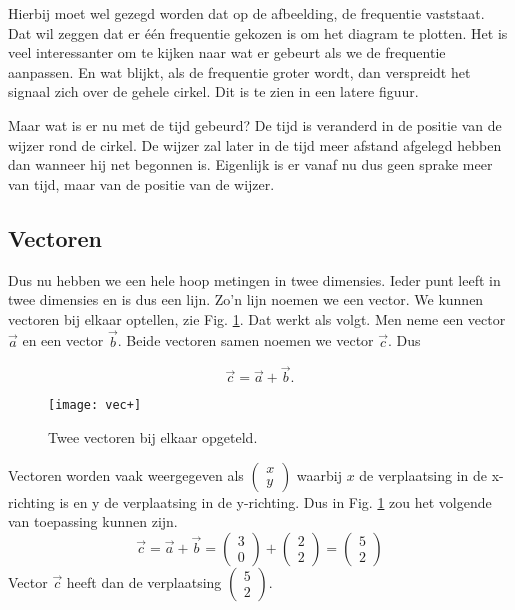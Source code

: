 \documentclass[11pt,fleqn]{book} %
\begin{document}
Hierbij moet wel gezegd worden dat op de afbeelding, de frequentie vaststaat. Dat wil zeggen dat er één frequentie gekozen is om het diagram te plotten. Het is veel interessanter om te kijken naar wat er gebeurt als we de frequentie aanpassen. En wat blijkt, als de frequentie groter wordt, dan verspreidt het signaal zich over de gehele cirkel. Dit is te zien in een latere figuur.

Maar wat is er nu met de tijd gebeurd? De tijd is veranderd in de positie van de wijzer rond de cirkel. De wijzer zal later in de tijd meer afstand afgelegd hebben dan wanneer hij net begonnen is. Eigenlijk is er vanaf nu dus geen sprake meer van tijd, maar van de positie van de wijzer.

\subsection{Vectoren}
Dus nu hebben we een hele hoop metingen in twee dimensies. Ieder punt leeft in twee dimensies en is dus een lijn. Zo'n lijn noemen we een vector. We kunnen vectoren bij elkaar optellen, zie Fig. \ref{fig:vec+}. Dat werkt als volgt. Men neme een vector $\vec{a}$ en een vector $\vec{b}$. Beide vectoren samen noemen we vector $\vec{c}$. Dus

\begin{displaymath}
	\vec{c}=\vec{a}+\vec{b}.
\end{displaymath}

\begin{figure}[h]
	\centering\texttt{[image: vec+]}
	\caption{Twee vectoren bij elkaar opgeteld.}
	\label{fig:vec+}
\end{figure}

Vectoren worden vaak weergegeven als $\begin{pmatrix}x \\ y\end{pmatrix}$ waarbij $x$ de verplaatsing in de x-richting is en y de verplaatsing in de y-richting. Dus in Fig. \ref{fig:vec+} zou het volgende van toepassing kunnen zijn.
\begin{displaymath}
	\vec{c}=\vec{a}+\vec{b}=\begin{pmatrix}3 \\ 0\end{pmatrix}+\begin{pmatrix}2 \\ 2\end{pmatrix}=\begin{pmatrix}5 \\ 2\end{pmatrix}
\end{displaymath}
Vector $\vec{c}$ heeft dan de verplaatsing $\begin{pmatrix}5 \\ 2\end{pmatrix}$.
\end{document}
